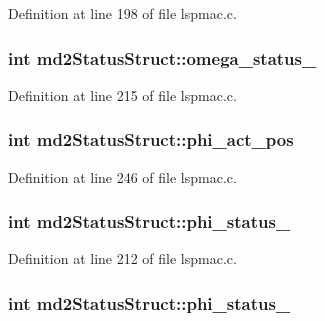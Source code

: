 Definition at line 198 of file lspmac.c.\hypertarget{structmd2StatusStruct_a8577c9df7b663b548b2759ac3db721cd}{
\subsubsection[{omega\_\-status\_\-2}]{\setlength{\rightskip}{0pt plus 5cm}int {\bf md2StatusStruct::omega\_\-status\_}}}
\label{structmd2StatusStruct_a8577c9df7b663b548b2759ac3db721cd}


Definition at line 215 of file lspmac.c.\hypertarget{structmd2StatusStruct_a4de22995a72ff6e72a1a9ccab6d00620}{
\subsubsection[{phi\_\-act\_\-pos}]{\setlength{\rightskip}{0pt plus 5cm}int {\bf md2StatusStruct::phi\_\-act\_\-pos}}}
\label{structmd2StatusStruct_a4de22995a72ff6e72a1a9ccab6d00620}


Definition at line 246 of file lspmac.c.\hypertarget{structmd2StatusStruct_ad8b8fd90ffff43016e2adaab5ccbfa02}{
\subsubsection[{phi\_\-status\_\-1}]{\setlength{\rightskip}{0pt plus 5cm}int {\bf md2StatusStruct::phi\_\-status\_}}}
\label{structmd2StatusStruct_ad8b8fd90ffff43016e2adaab5ccbfa02}


Definition at line 212 of file lspmac.c.\hypertarget{structmd2StatusStruct_a0e6cea4c32cb34e602b9ac3d21259219}{
\subsubsection[{phi\_\-status\_\-2}]{\setlength{\rightskip}{0pt plus 5cm}int {\bf md2StatusStruct::phi\_\-status\_}}}
\label{structmd2StatusStruct_a0e6cea4c32cb34e602b9ac3d21259219}


